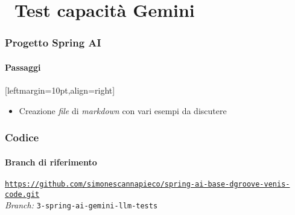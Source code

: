 \section{\faWrench\ Test capacità Gemini} %
\label{sec:spring-ai-gemini-service}
%
\begin{frame}[t,fragile] \frametitle{Progetto Spring AI}
    \framesubtitle{Passaggi}[leftmargin=10pt,align=right]
	\begin{itemize}
        \item[\alertedcircled{1}] Creazione \textit{file} di \textit{markdown} con vari esempi da discutere
	\end{itemize}
\end{frame}
%
\begin{frame}[fragile] \frametitle{Codice}
    \framesubtitle{Branch di riferimento}
	\begin{center}
		{\scriptsize \href{https://github.com/simonescannapieco/spring-ai-base-dgroove-venis-code.git}{\texttt{https://github.com/simonescannapieco/spring-ai-base-dgroove-venis-code.git}}}\\
		\textit{Branch:} \alert{\texttt{3-spring-ai-gemini-llm-tests}}
	\end{center}
\end{frame}